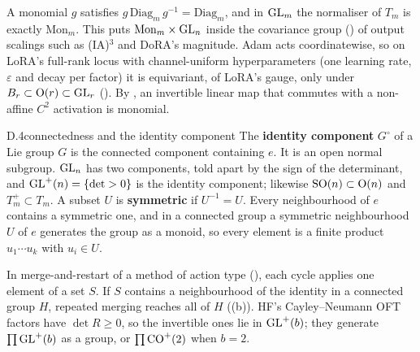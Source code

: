 A monomial $g$ satisfies $g\,\mathrm{Diag}_m\,g^{-1}=\mathrm{Diag}_m$, and in $\mathrm{GL}_m$ the normaliser of $T_m$ is exactly
$\mathrm{Mon}_m$. This puts $\mathrm{Mon}_m\times\mathrm{GL}_n$ inside the covariance group () of output scalings
such as (IA)$^3$ and DoRA's magnitude. Adam \citep{xkingma2015adam} acts coordinatewise, so on LoRA's full-rank locus with
channel-uniform hyperparameters (one learning rate, $\varepsilon$ and decay per factor) it is equivariant, of LoRA's
gauge, only under $B_r\subset\mathrm{O}(r)\subset\mathrm{GL}_r$ (). By , an invertible linear map that
commutes with a non-affine $C^2$ activation is monomial.


\begin{bgentry}{D.4}{connectedness and the identity component}
The \textbf{identity component} $G^\circ$ of a Lie group $G$ is the connected component containing $e$. It is an open
normal subgroup. $\mathrm{GL}_n$ has two components, told apart by the sign of the determinant, and $\mathrm{GL}^+(n)=\{\det>0\}$ is the
identity component; likewise $\mathrm{SO}(n)\subset\mathrm{O}(n)$ and $T_m^+\subset T_m$. A subset $U$ is \textbf{symmetric} if
$U^{-1}=U$. Every neighbourhood of $e$ contains a symmetric one, and in a connected group a symmetric neighbourhood $U$
of $e$ generates the group as a monoid, so every element is a finite product $u_1\cdots u_k$ with $u_i\in U$.
\end{bgentry}

In merge-and-restart of a method of action type (), each cycle applies one element of a set $S$. If $S$
contains a neighbourhood of the identity in a connected group $H$, repeated merging reaches all of $H$
((b)). HF's \citep{xmangrulkar2022peft} Cayley--Neumann OFT factors have $\det R\ge0$, so the
invertible ones lie in $\mathrm{GL}^+(b)$; they generate $\prod\mathrm{GL}^+(b)$ as a group, or $\prod\mathrm{CO}^+(2)$ when $b=2$.


